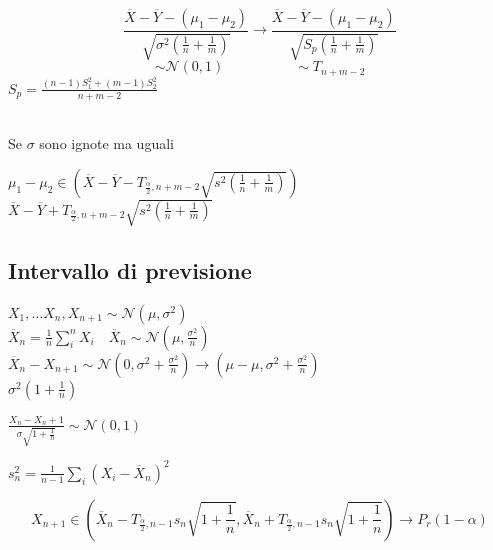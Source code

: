 \documentclass[]{article}
\begin{document}
    \[ \frac{\overline{X} - \overline{Y} - (\mu_1 - \mu_2)}{\sqrt{\sigma^2 (\frac{1}{n} + \frac{1}{m})}} \longrightarrow \frac{\overline{X} - \overline{Y} - (\mu_1 - \mu_2)}{\sqrt{S_p(\frac{1}{n} + \frac{1}{m})}} \]
    \[ \sim \mathcal{N}(0,1) \quad \quad \quad \quad \quad \sim T_{n+m-2}\]
    $S_p = \frac{(n-1) S_1^2 + (m-1) S_2^2}{n+m-2}$ \\ \\
    \centerline{Se $\sigma$ sono ignote ma uguali}
    $\mu_1 - \mu_2 \in (\overline{X} - \overline{Y} -T_{\frac{\alpha}{2},n+m-2} \sqrt{s^2(\frac{1}{n} + \frac{1}{m})})$ \\
    $\overline{X} - \overline{Y} + T_{\frac{\alpha}{2}, n+m-2} \sqrt{s^2 (\frac{1}{n} + \frac{1}{m})}$
    \subsection{Intervallo di previsione}
    $X_1, \ldots X_n, X_{n+1} \sim \mathcal{N}(\mu, \sigma^2)$ \\
    $\overline{X}_n = \frac{1}{n} \sum_{i}^{n} X_i \quad \overline{X}_n \sim \mathcal{N}(\mu, \frac{\sigma^2}{n})$ \\
    $\overline{X}_n - X_{n+1} \sim \mathcal{N}(0, \sigma^2 + \frac{\sigma^2}{n}) \rightarrow (\mu - \mu, \sigma^2 + \frac{\sigma^2}{n})$ \\
    $\sigma^2(1 + \frac{1}{n})$
    \begin{minipage}{0.4\textwidth}
        $\frac{X_n - X_n + 1}{\sigma \sqrt{1 + \frac{1}{n}}} \sim \mathcal{N}(0,1)$
    \end{minipage}
    \begin{minipage}{0.4\textwidth}
        $s_n^2 = \frac{1}{n-1} \sum_{i}^{} (X_i - \overline{X}_n)^2$
    \end{minipage}
    \[ X_{n+1} \in(\overline{X}_n - T_{\frac{\alpha}{2}, n-1} s_n \sqrt{1 + \frac{1}{n}}, \overline{X}_n + T_{\frac{\alpha}{2}, n-1} s_n \sqrt{1 + \frac{1}{n}}) \longrightarrow P_r(1-\alpha) \]
\end{document}
